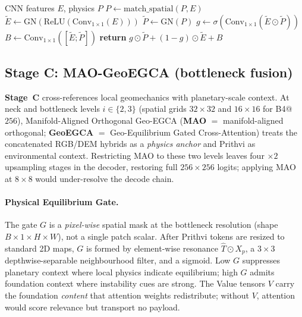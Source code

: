 \begin{algorithm}[htbp]
\caption{Complementary Modality Bridge (CMB)}
\label{alg:cmb}
\begin{algorithmic}
\Require CNN features \(E\), physics \(P\)
\State \(P\leftarrow\mathrm{match\_spatial}(P,E)\)
\State \(\tilde{E}\leftarrow\mathrm{GN}(\mathrm{ReLU}(\mathrm{Conv}_{1\times1}(E)))\)
\State \(\tilde{P}\leftarrow\mathrm{GN}(P)\)
\State \(g\leftarrow\sigma(\mathrm{Conv}_{1\times1}(\tilde{E}\odot\tilde{P}))\)
\State \(B\leftarrow\mathrm{Conv}_{1\times1}([\tilde{E};\tilde{P}])\)
\State \textbf{return} \(g\odot\tilde{P}+(1-g)\odot\tilde{E}+B\)
\end{algorithmic}
\end{algorithm}

\subsection{Stage C: MAO-GeoEGCA (bottleneck fusion)}
\label{sec:mao}
\textbf{Stage~C} cross-references local geomechanics with planetary-scale context. At neck and bottleneck levels $i\in\{2,3\}$ (spatial grids $32\times32$ and $16\times16$ for B4@$256$), Manifold-Aligned Orthogonal Geo-EGCA (\textbf{MAO} $=$ manifold-aligned orthogonal; \textbf{GeoEGCA} $=$ Geo-Equilibrium Gated Cross-Attention) treats the concatenated RGB/DEM hybrids as a \emph{physics anchor} and Prithvi as environmental context. Restricting MAO to these two levels leaves four $\times2$ upsampling stages in the decoder, restoring full $256\times256$ logits; applying MAO at $8\times8$ would under-resolve the decode chain.

\paragraph{Physical Equilibrium Gate.}
The gate $G$ is a \emph{pixel-wise} spatial mask at the bottleneck resolution (shape $B\times 1\times H\times W$), not a single patch scalar. After Prithvi tokens are resized to standard 2D maps, $G$ is formed by element-wise resonance $\hat{T}\odot X_p$, a $3\times3$ depthwise-separable neighbourhood filter, and a sigmoid. Low $G$ suppresses planetary context where local physics indicate equilibrium; high $G$ admits foundation context where instability cues are strong. The Value tensors $V$ carry the foundation \emph{content} that attention weights redistribute; without $V$, attention would score relevance but transport no payload.


